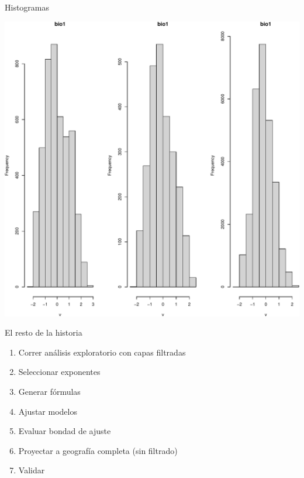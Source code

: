 \documentclass[
  11pt,
  ignorenonframetext,
]{beamer}
\providecommand{\tightlist}{%
  \setlength{\itemsep}{0pt}\setlength{\parskip}{0pt}}
\begin{document}
\begin{frame}{Histogramas}
\protect\hypertarget{histogramas}{}
\begin{center}\includegraphics{Tutorial-spatstat-2_files/figure-beamer/unnamed-chunk-26-1} \end{center}
\end{frame}

\begin{frame}{El resto de la historia}
\protect\hypertarget{el-resto-de-la-historia}{}
\begin{enumerate}
\tightlist
\item
  Correr análisis exploratorio con capas filtradas
\item
  Seleccionar exponentes
\item
  Generar fórmulas
\item
  Ajustar modelos
\item
  Evaluar bondad de ajuste
\item
  Proyectar a geografía completa (sin filtrado)
\item
  Validar
\end{enumerate}
\end{frame}
\end{document}
